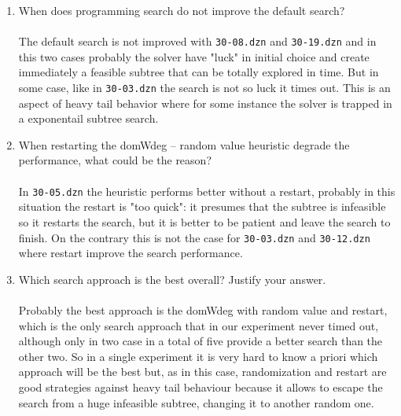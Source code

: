\documentclass{article}
\begin{document}
    \begin{enumerate}
    \item When does programming search do not improve the default search? \\ \\
    The default search is not improved with \texttt{30-08.dzn} and \texttt{30-19.dzn} and in this two cases probably the solver have "luck" in initial choice and create immediately a feasible subtree that can be totally explored in time. But in some case, like in \texttt{30-03.dzn} the search is not so luck it times out. This is an aspect of heavy tail behavior where for some instance the solver is trapped in a exponentail subtree search. \\
    \item When restarting the domWdeg – random value heuristic degrade the performance, what could be the reason? \\ \\
    In \texttt{30-05.dzn} the heuristic performs better without a restart, probably in this situation the restart is "too quick": it presumes that the subtree is infeasible so it restarts the search, but it is better to be patient and leave the search to finish. On the contrary this is not the case for \texttt{30-03.dzn} and \texttt{30-12.dzn} where restart improve the search performance. \\ 
    \item Which search approach is the best overall? Justify your answer. \\ \\
     Probably the best approach is the domWdeg with random value and restart, which is the only search approach that in our experiment never timed out, although only in two case in a total of five provide a better search than the other two. So in a single experiment it is very hard to know a priori which approach will be the best but, as in this case, randomization and restart are good strategies against heavy tail behaviour because it allows to escape the search from a huge infeasible subtree, changing it to another random one. 
    \end{enumerate}
    
\end{document}
